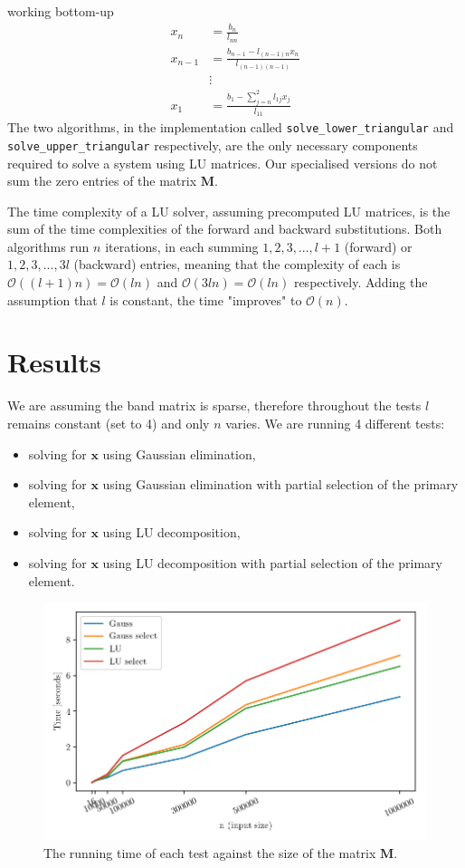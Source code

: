 \documentclass[12pt, a4paper]{article}
\newcommand{\code}[1]{\texttt{#1}}
\newcommand{\bigO}{\mathcal{O}}
\begin{document}
working bottom-up
\begin{align*}
x_n &= \frac{b_n}{l_{nn}} \\
x_{n-1}&= \frac{b_{n-1} - l_{(n-1)n}x_n}{l_{(n-1)(n-1)}} \\
    &\vdots \\
x_1 &= \frac{b_1 - \sum^{2}_{j = n} l_{1j}x_j}{l_{11}}
\end{align*}
The two algorithms, in the implementation called \code{solve\_lower\_triangular}
and \code{solve\_upper\_triangular} respectively, are the only necessary
components required to solve a system using LU matrices. Our specialised
versions do not sum the zero entries of the matrix $\bm{M}$.

The time complexity of a LU solver, assuming precomputed LU matrices, is the sum
of the time complexities of the forward and backward substitutions. Both
algorithms run $n$ iterations, in each summing $1, 2, 3, ..., l + 1$ (forward)
or $1, 2, 3, ..., 3l$ (backward) entries, meaning that the complexity of each is
$\bigO((l + 1) n) = \bigO(ln)$ and $\bigO(3l n) = \bigO(ln)$ respectively.
Adding the assumption that $l$ is constant, the time "improves" to $\bigO(n)$.

\section{Results}
We are assuming the band matrix is sparse, therefore throughout the tests $l$
remains constant (set to 4) and only $n$ varies. We are running 4 different
tests:
\begin{itemize}
  \item solving for $\bm{x}$ using Gaussian elimination,
  \item solving for $\bm{x}$ using Gaussian elimination with partial selection
   of the primary element,
  \item solving for $\bm{x}$ using LU decomposition,
  \item solving for $\bm{x}$ using LU decomposition with partial selection of
  the primary element.
\end{itemize}

\begin{figure}[ht]
\includegraphics[width=\columnwidth]{runtime.png}
\caption{The running time of each test against the size of the matrix $\bm{M}$.}
\label{fig:runtime}
\end{figure}
\end{document}
